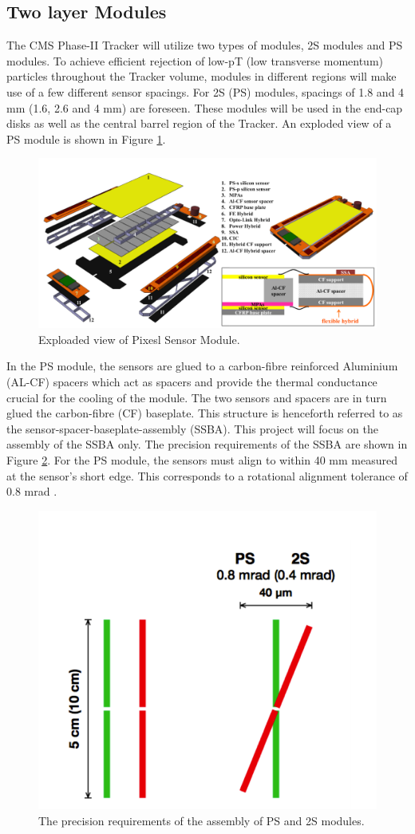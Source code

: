 \subsection{Two layer Modules}

The CMS Phase-II Tracker will utilize two types of modules, 2S modules and PS modules. To achieve efficient rejection of low-pT (low transverse momentum) particles throughout the Tracker volume, modules in different regions will make use of a few different sensor spacings. For 2S (PS) modules, spacings of 1.8 and 4 mm (1.6, 2.6 and 4 mm) are foreseen. These modules will be used in the end-cap disks as well as the central barrel region of the Tracker. An exploded view of a PS module is shown in Figure \ref{fig:ps_exploaded}.
\begin{figure}[ht]\centering
\includegraphics[width=0.8\linewidth]{Data/Introduction/PS_exploaded.png}
\caption{Exploaded view of Pixesl Sensor Module.}
\label{fig:ps_exploaded}
\end{figure}

In the PS module, the sensors are glued to a carbon-fibre reinforced Aluminium (AL-CF) spacers which act as spacers and provide the thermal conductance crucial for the cooling of the module. The two sensors and spacers are in turn glued the carbon-fibre (CF) baseplate. This structure is henceforth referred to as the sensor-spacer-baseplate-assembly (SSBA). This project will focus on the assembly of the SSBA only. The precision requirements of the SSBA are shown in Figure \ref{fig:ps(2s)_precision}. For the PS module, the sensors must align to within 40 mm measured at the sensor’s short edge. This corresponds to a rotational alignment tolerance of 0.8 mrad \cite{AutomatedAssembly_tutorial}.

\begin{figure}[ht]\centering
\includegraphics[width=0.4\linewidth]{Data/Introduction/PS(2S)_precision.png}
\caption{The precision requirements of the assembly of PS
and 2S modules.}
\label{fig:ps(2s)_precision}
\end{figure}
